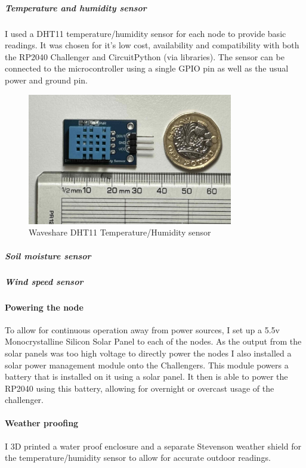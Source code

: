 \subparagraph{Temperature and humidity sensor}

I used a DHT11 temperature/humidity sensor for each node to provide basic
readings. It was chosen for it's low cost, availability and compatibility with
both the RP2040 Challenger and CircuitPython (via libraries). The sensor can be
connected to the microcontroller using a single GPIO pin as well as the usual
power and ground pin.

\begin{figure}[H]
    \centering
    \includegraphics[width=0.8\textwidth]{contents/22-hw-design/22-fig/dht11.jpg}
    \caption{Waveshare DHT11 Temperature/Humidity sensor}
    \label{fig:dht11}
\end{figure}

\subparagraph{Soil moisture sensor}

\subparagraph{Wind speed sensor}

\paragraph{Powering the node}

To allow for continuous operation away from power sources, I set up a 5.5v
Monocrystalline Silicon Solar Panel to each of the nodes. As the output from the
solar panels was too high voltage to directly power the nodes I also installed a
solar power management module onto the Challengers. This module powers a battery
that is installed on it using a solar panel. It then is able to power the RP2040
using this battery, allowing for overnight or overcast usage of the challenger.

\paragraph{Weather proofing}

I 3D printed a water proof enclosure and a separate Stevenson weather shield for
the temperature/humidity sensor to allow for accurate outdoor readings.


